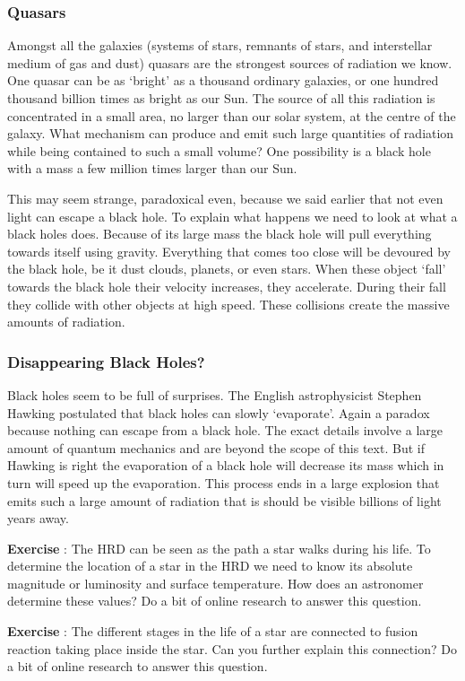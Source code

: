 \documentclass[12pt,a4paper]{article}
\numberwithin{equation}{section}
\numberwithin{figure}{section}
\newcounter{Exercise}
\numberwithin{table}{section}
\begin{document}
\subsubsection{Quasars}
Amongst all the galaxies (systems of stars, remnants of stars, and interstellar medium of gas and dust) quasars are the strongest sources of radiation we know. One quasar can be as `bright' as a thousand ordinary galaxies, or one hundred thousand billion times as bright as our Sun. The source of all this radiation is concentrated in a small area, no larger than our solar system, at the centre of the galaxy. What mechanism can produce and emit such large quantities of radiation while being contained to such a small volume? One possibility is a black hole with a mass a few million times larger than our Sun.

This may seem strange, paradoxical even, because we said earlier that not even light can escape a black hole. To explain what happens we need to look at what a black holes does. Because of its large mass the black hole will pull everything towards itself using gravity. Everything that comes too close will be devoured by the black hole, be it dust clouds, planets, or even stars. When these object `fall' towards the black hole their velocity increases, they accelerate. During their fall they collide with other objects at high speed. These collisions create the massive amounts of radiation.

\subsubsection{Disappearing Black Holes?}
Black holes seem to be full of surprises. The English astrophysicist Stephen Hawking postulated that black holes can slowly `evaporate'. Again a paradox because nothing can escape from a black hole. The exact details involve a large amount of quantum mechanics and are beyond the scope of this text. But if Hawking is right the evaporation of a black hole will decrease its mass which in turn will speed up the evaporation. This process ends in a large explosion that emits such a large amount of radiation that is should be visible billions of light years away.

\begin{shaded}
\textbf{Exercise \theExercise {}} : The HRD can be seen as the path a star walks during his life. To determine the location of a star in the HRD we need to know its absolute magnitude or luminosity and surface temperature. How does an astronomer determine these values? Do a bit of online research to answer this question.\end{shaded}

\begin{shaded}
\textbf{Exercise \theExercise {}} : The different stages in the life of a star are connected to fusion reaction taking place inside the star. Can you further explain this connection? Do a bit of online research to answer this question.\end{shaded}
\end{document}
